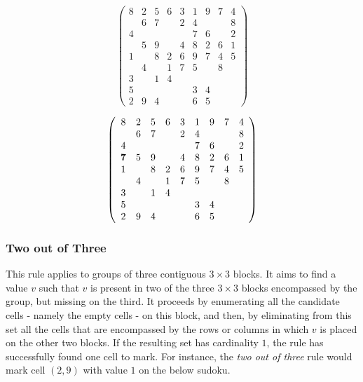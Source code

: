 \documentclass{article}
\begin{document}
\[ \left( \begin{array}{ccccccccc}
8 & 2 & 5 & 6 & 3 & 1 & 9 & 7 & 4 \\
  & 6 & 7 &   & 2 & 4 &   &   & 8 \\
4 &   &   &   &   & 7 & 6 &   & 2 \\
  & 5 & 9 &   & 4 & 8 & 2 & 6 & 1 \\
1 &   & 8 & 2 & 6 & 9 & 7 & 4 & 5 \\
  & 4 &   & 1 & 7 & 5 &   & 8 &   \\
3 &   & 1 & 4 &   &   &   &   &   \\
5 &   &   &   &   & 3 & 4 &   &   \\
2 & 9 & 4 &   &   & 6 & 5 &   &   \end{array}  \right)\]

\[ \left( \begin{array}{ccccccccc}
8 & 2 & 5 & 6 & 3 & 1 & 9 & 7 & 4 \\
  & 6 & 7 &   & 2 & 4 &   &   & 8 \\
4 &   &   &   &   & 7 & 6 &   & 2 \\
{\bf 7} & 5 & 9 &   & 4 & 8 & 2 & 6 & 1 \\
1 &   & 8 & 2 & 6 & 9 & 7 & 4 & 5 \\
  & 4 &   & 1 & 7 & 5 &   & 8 &   \\
3 &   & 1 & 4 &   &   &   &   &   \\
5 &   &   &   &   & 3 & 4 &   &   \\
2 & 9 & 4 &   &   & 6 & 5 &   &   \end{array}  \right)\]

\subsubsection{Two out of Three}

This rule applies to groups of three contiguous $3 \times 3$ blocks. It aims to find a value $v$ such that $v$ is present in two of the three $3 \times 3$ blocks encompassed by the group, but missing on the third. It proceeds by enumerating all the candidate cells - namely the empty cells - on this block, and then, by eliminating from this set all the cells that are encompassed by the rows or columns in which $v$ is placed on the other two blocks. If the resulting set has cardinality $1$, the rule has successfully found one cell to mark. For instance, the {\em two out of three} rule would mark cell $(2,9)$ with value $1$ on the below sudoku.
\end{document}
